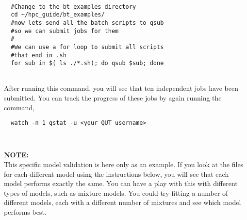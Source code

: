\\
\par
\begin{verbatim}
  #Change to the bt_examples directory
  cd ~/hpc_guide/bt_examples/
  #now lets send all the batch scripts to qsub
  #so we can submit jobs for them
  #
  #We can use a for loop to submit all scripts
  #that end in .sh
  for sub in $( ls ./*.sh); do qsub $sub; done
\end{verbatim}
% 
\\
% 
After running this command, you will see that ten independent jobs have been submitted. You can track the progress of these jobs by again running the command,
\\
\par
\begin{verbatim}
  watch -n 1 qstat -u <your_QUT_username>
\end{verbatim}
%
\\
% 
\begin{story}
  \textbf{NOTE:}
  \\
  This specific model validation is here only as an example. If you look at the  files for each different model using the instructions below, you will see that each model performs exactly the same. You can have a play with this with different types of models, such as mixture models. You could try fitting a number of different models, each with a different number of mixtures and see which model performs best.
\end{story}

